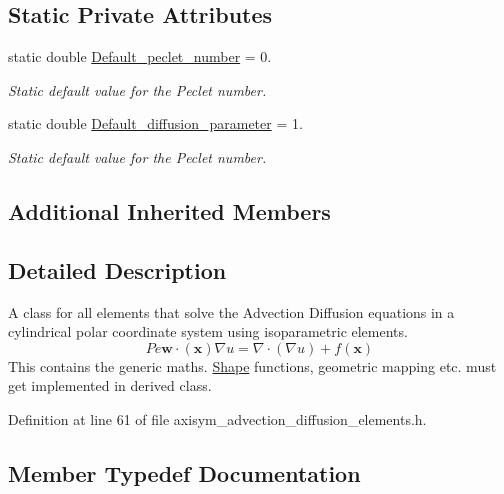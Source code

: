 \subsection*{Static Private Attributes}
\begin{DoxyCompactItemize}
\item 
static double \hyperlink{classoomph_1_1AxisymAdvectionDiffusionEquations_a8597f955eb2780f02d9479ebc678ba24}{Default\+\_\+peclet\+\_\+number} = 0.
\begin{DoxyCompactList}\small\item\em Static default value for the Peclet number. \end{DoxyCompactList}\item 
static double \hyperlink{classoomph_1_1AxisymAdvectionDiffusionEquations_abef5adeae70c304fda61918174a100db}{Default\+\_\+diffusion\+\_\+parameter} = 1.
\begin{DoxyCompactList}\small\item\em Static default value for the Peclet number. \end{DoxyCompactList}\end{DoxyCompactItemize}
\subsection*{Additional Inherited Members}


\subsection{Detailed Description}
A class for all elements that solve the Advection Diffusion equations in a cylindrical polar coordinate system using isoparametric elements. \[ Pe \mathbf{w}\cdot(\mathbf{x}) \nabla u = \nabla \cdot \left( \nabla u \right) + f(\mathbf{x}) \] This contains the generic maths. \hyperlink{classoomph_1_1Shape}{Shape} functions, geometric mapping etc. must get implemented in derived class. 

Definition at line 61 of file axisym\+\_\+advection\+\_\+diffusion\+\_\+elements.\+h.



\subsection{Member Typedef Documentation}
\mbox{\label{classoomph_1_1AxisymAdvectionDiffusionEquations_a5110527308cbe58e90fb9ac146d172a0}} 
